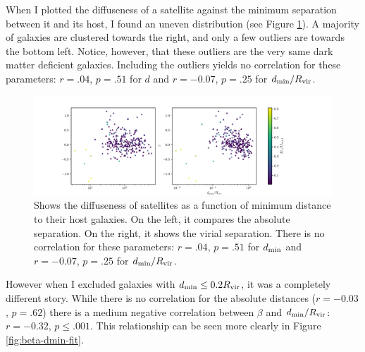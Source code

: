 When I plotted the diffuseness of a satellite against the minimum separation between it and its host, I found an uneven distribution (see Figure \ref{fig:beta-dmin}). A majority of galaxies are clustered towards the right, and only a few outliers are towards the bottom left. Notice, however, that these outliers are the very same dark matter deficient galaxies. Including the outliers yields no correlation for these parameters: $r = .04$, $p=.51$ for $d$ and $r = -0.07$, $p = .25$ for $d_{\rm{min}} / R_{\rm{vir}}$.
\begin{figure}
    \centering
    \includegraphics*[width=\textwidth*11/10]{figs/me/beta-dmin.pdf}
    \caption{Shows the diffuseness of satellites as a function of minimum distance to their host galaxies. On the left, it compares the absolute separation. On the right, it shows the virial separation. There is no correlation for these parameters: $r = .04$, $p=.51$ for $d_{\rm{min}}$ and $r = -0.07$, $p = .25$ for $d_{\rm{min}} / R_{\rm{vir}}$.}
    \label{fig:beta-dmin}
\end{figure}

However when I excluded galaxies with $d_{\rm{min}} \leq 0.2 R_{\rm{vir}}$, it was a completely different story. While there is no correlation for the absolute distances ($r = -0.03$, $p = .62$) there is a medium negative correlation between $\beta$ and $d_{\rm{min}}/R_{\rm{vir}}$: $r=-0.32$, $p \leq .001$. This relationship can be seen more clearly in Figure \ref{fig:beta-dmin-fit}.

